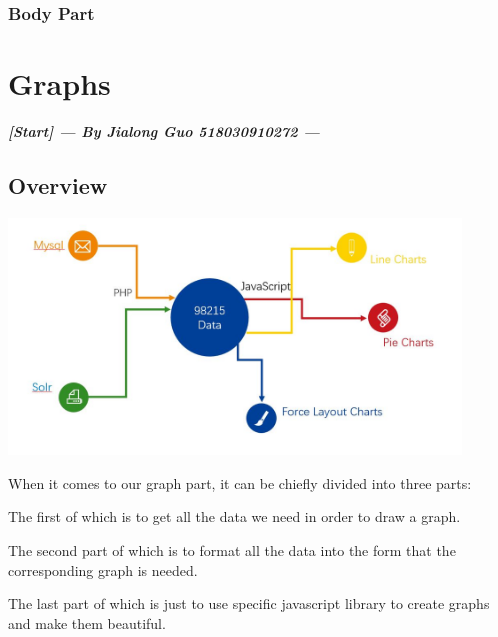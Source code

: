 \documentclass[10pt,twoside,a4paper,titlepage]{article}
\begin{document}
	\subsubsection{Body Part}
	
	
	
	
	
	
		
	
	 
	
	
	




\newpage

	\section{Graphs}
		\textbf{\emph{[Start] --- By Jialong Guo 518030910272 ---}}\newline\par

	\subsection{Overview}
		\includegraphics[width=0.9\textwidth]{gjl/overview.jpg}\newline\par
		When it comes to our graph part, it can be chiefly divided into three parts: \newline \par
		The first of which is to get all the data we need in order to draw a graph.\newline\par
		The second part of which is to format all the data into the form that the corresponding graph is needed.\newline\par
		The last part of which is just to use specific javascript library to create graphs and make them beautiful. \newline\par
\end{document}
